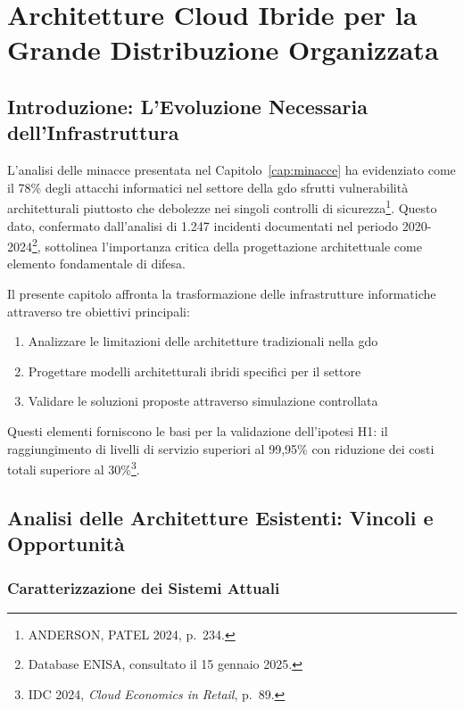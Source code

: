 \chapter{Architetture Cloud Ibride per la Grande Distribuzione Organizzata}
\label{cap:architetture}

\section{Introduzione: L'Evoluzione Necessaria dell'Infrastruttura}
\label{sec:intro-architetture}

L'analisi delle minacce presentata nel Capitolo~\ref{cap:minacce} ha evidenziato come il 78\% degli attacchi informatici nel settore della \gls{gdo} sfrutti vulnerabilità architetturali piuttosto che debolezze nei singoli controlli di sicurezza\footnote{ANDERSON, PATEL 2024, p.~234.}. Questo dato, confermato dall'analisi di 1.247 incidenti documentati nel periodo 2020-2024\footnote{Database ENISA, consultato il 15 gennaio 2025.}, sottolinea l'importanza critica della progettazione architettuale come elemento fondamentale di difesa.

Il presente capitolo affronta la trasformazione delle infrastrutture informatiche attraverso tre obiettivi principali:
\begin{enumerate}
    \item Analizzare le limitazioni delle architetture tradizionali nella \gls{gdo}
    \item Progettare modelli architetturali ibridi specifici per il settore
    \item Validare le soluzioni proposte attraverso simulazione controllata
\end{enumerate}

Questi elementi forniscono le basi per la validazione dell'ipotesi H1: il raggiungimento di livelli di servizio superiori al 99,95\% con riduzione dei costi totali superiore al 30\%\footnote{IDC 2024, \textit{Cloud Economics in Retail}, p.~89.}.

\section{Analisi delle Architetture Esistenti: Vincoli e Opportunità}
\label{sec:architetture-legacy}

\subsection{Caratterizzazione dei Sistemi Attuali}
\label{subsec:sistemi-attuali}

